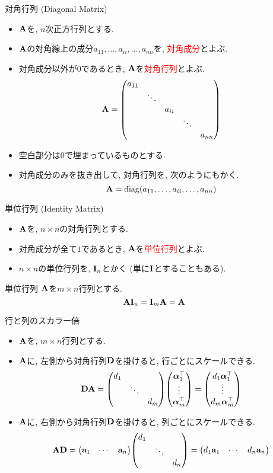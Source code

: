 \documentclass[dvipdfmx,notheorems,t]{beamer}
\begin{document}
\begin{frame}{対角行列 (Diagonal Matrix)}
\begin{itemize}
  \item $\vb{A}$を, $n$次正方行列とする.
  \item $\vb{A}$の対角線上の成分$a_{11}, \ldots, a_{ii}, \ldots, a_{nn}$を, \textcolor{red}{対角成分}とよぶ.
  \item 対角成分以外が$0$であるとき, $\vb{A}$を\textcolor{red}{対角行列}とよぶ.
  $$\vb{A} = \mqty(\dmat{a_{11}, \ddots, a_{ii}, \ddots, a_{nn}})$$
  \item 空白部分は$0$で埋まっているものとする.
  \item 対角成分のみを抜き出して, 対角行列を, 次のようにもかく.
  $$\vb{A} = \operatorname{diag}(a_{11}, \ldots, a_{ii}, \ldots, a_{nn})$$
\end{itemize}
\end{frame}

\begin{frame}{単位行列 (Identity Matrix)}
\begin{itemize}
  \item $\vb{A}$を, $n \times n$の対角行列とする.
  \item 対角成分が全て$1$であるとき, $\vb{A}$を\textcolor{red}{単位行列}とよぶ.
  \item $n \times n$の単位行列を, $\vb{I}_n$とかく (単に$\vb{I}$とすることもある).
\end{itemize}

\begin{block}{単位行列}
  $\vb{A}$を$m \times n$行列とする.
  $$\vb{A} \vb{I}_n = \vb{I}_m \vb{A} = \vb{A}$$
\end{block}
\end{frame}

\begin{frame}{行と列のスカラー倍}
\begin{itemize}
  \item $\vb{A}$を, $m \times n$行列とする.
  \item $\vb{A}$に, 左側から対角行列$\vb{D}$を掛けると, 行ごとにスケールできる.
  \begin{align*}
    \vb{D} \vb{A} = \mqty(\dmat{d_1, \ddots, d_m})
      \mqty(\vb*{\alpha}_1^\top \\ \vdots \\ \vb*{\alpha}_m^\top)
      = \mqty(d_1 \vb*{\alpha}_1^\top \\ \vdots \\ d_m \vb*{\alpha}_m^\top)
  \end{align*}
  \item $\vb{A}$に, 右側から対角行列$\vb{D}$を掛けると, 列ごとにスケールできる.
  \begin{align*}
    \vb{A} \vb{D} = \mqty(\vb{a}_1 & \cdots & \vb{a}_n)
      \mqty(\dmat{d_1, \ddots, d_n})
      = \mqty(d_1 \vb{a}_1 & \cdots & d_n \vb{a}_n)
  \end{align*}
\end{itemize}
\end{frame}
\end{document}
